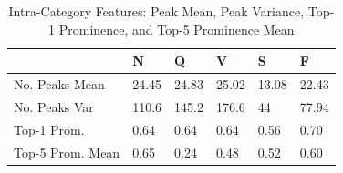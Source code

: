 \documentclass[a4paper,10pt,twocolumn]{article}
\begin{document}




\begin{table}[h]
\centering
\begin{tabular}{|l||lllll|}
\hline
                    & N & Q & V & S  & F   \\
                     \hline
                     \hline
No. Peaks Mean      & 24.45     & 24.83     & 25.02     & 13.08     & 22.43    \\
No. Peaks Var       & 110.6    & 145.2    & 176.6    & 44     & 77.94    \\
Top-1 Prom.         & 0.64      & 0.64      & 0.64      & 0.56      & 0.70    \\
Top-5 Prom. Mean    & 0.65      & 0.24      & 0.48      & 0.52      & 0.60    \\
\hline
\end{tabular}
\caption{Intra-Category Features: Peak Mean, Peak Variance, Top-1 Prominence, and Top-5 Prominence Mean}
\label{tab:beat_features}
\end{table}




\end{document}
